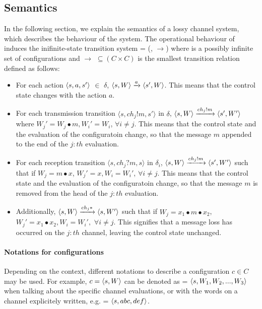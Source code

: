 \subsection{Semantics}
In the following section, we explain the semantics of a lossy channel system, which describes the behaviour of the system. The operational behaviour of  induces the inifinite-state transition system  = (, $\rightarrow$) where  is a possibly infinite set of configurations and $\rightarrow$ $\subseteq (C \times C)$  is the smallest transition relation defined as follows:
  \begin{itemize}
    \item For each action $\langle s, a, s'\rangle$ $\in$ $\delta$, $\langle s, W\rangle \xrightarrow{a} \langle s', W\rangle$. This means that the control state changes with the action $a$.
    \item For each transmission transition $\langle s, ch_j!m, s' \rangle$ in $\delta$, $\langle s, W\rangle \xrightarrow{ch_j!m} \langle s', W'\rangle$ where $W_j' = W_j\bullet m, W_i' = W_i$, $\forall i \neq j$. This means that the control state and the evaluation of the configuratoin change, so that the message $m$ appended to the end of the $j:th$ evaluation.
    \item For each reception transition $\langle s, ch_j?m, s \rangle$ in $\delta_i$, $\langle s, W\rangle \xrightarrow{ch_j!m} \langle s', W'\rangle$ such that if $W_j = m\bullet x$, $W_j' = x, W_i = W_i'$, $\forall i \neq j$. This means that the control state and the evaluation of the configuratoin change, so that the message $m$ is removed from the head of the $j:th$ evaluation.
    \item Additionally, $\langle s, W\rangle \xrightarrow{ch_j*} \langle s, W'\rangle$ such that if $W_j = x_1\bullet m \bullet x_2$, $W_j' = x_1\bullet x_2, W_i = W_i',$ $\forall i \neq j$. This signifies that a message loss has occurred on the $j:th$ channel, leaving the control state unchanged.
  \end{itemize}

\paragraph{Notations for configurations}
Depending on the context, different notations to describe a configuration $c\in C$ may be used. For example, $c = \langle s, W\rangle$ can be denoted as  = $\langle s, W_1, W_2, ..., W_3\rangle$ when talking about the specific channel evaluations, or with the words on a channel explicitely written, e.g.  = $\langle s, abc, def\rangle$.

